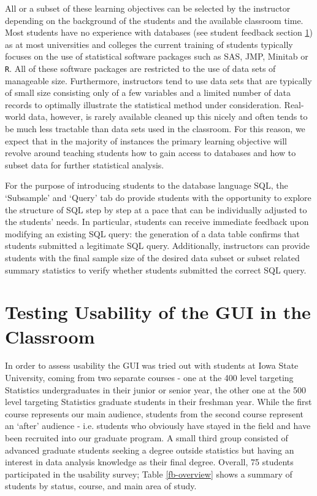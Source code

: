 \documentclass[11pt]{tise_style}
\begin{document}
All or a subset of these learning objectives can be selected by the instructor depending on the background of the students and the available classroom time.\\
Most students have no experience with databases (see student feedback section \ref{implement}) as at most universities and colleges the current training of students typically focuses on the use of statistical software packages such as SAS, JMP, Minitab or {\tt R}. All of these software packages are restricted to the use of data sets of manageable size. Furthermore, instructors tend to use data sets that are typically of small size consisting only of a few variables and a limited number of data records to optimally illustrate the statistical method under consideration.  Real-world data, however, is rarely available cleaned up this nicely and often tends to be much less tractable than data sets used in the classroom.   For this reason, we expect that in the majority of instances the primary learning objective will revolve around teaching students how to gain access to databases and how to subset data for further statistical analysis.

For the purpose of introducing students to the database language SQL, the `Subsample' and `Query' tab do provide students with the opportunity to explore the structure of SQL step by step at a pace that can be individually adjusted to the students' needs. In particular, students can receive immediate feedback upon modifying an existing SQL query: the generation of a data table confirms that students submitted a legitimate SQL query. Additionally, instructors can provide students with the final sample size of the desired data subset or subset related summary statistics to verify whether students submitted the correct SQL query.


\section{Testing Usability of the GUI in the Classroom}
\label{implement}
In order to assess usability the GUI was tried out with students at Iowa State University, coming from two separate courses - one at the 400 level targeting Statistics undergraduates in their junior or senior year, the other one at the 500 level targeting Statistics graduate students in their freshman year. While the first course represents  our main audience, students from the second course represent an `after' audience - i.e. students who obviously have stayed in the field and have been recruited into our graduate program.  A small third group consisted of advanced graduate students seeking a degree outside statistics but having an interest in data analysis knowledge as their final degree.  Overall, 75 students participated in the usability survey; Table \ref{fb-overview} shows a summary of students by status, course, and main area of study. 
\end{document}
